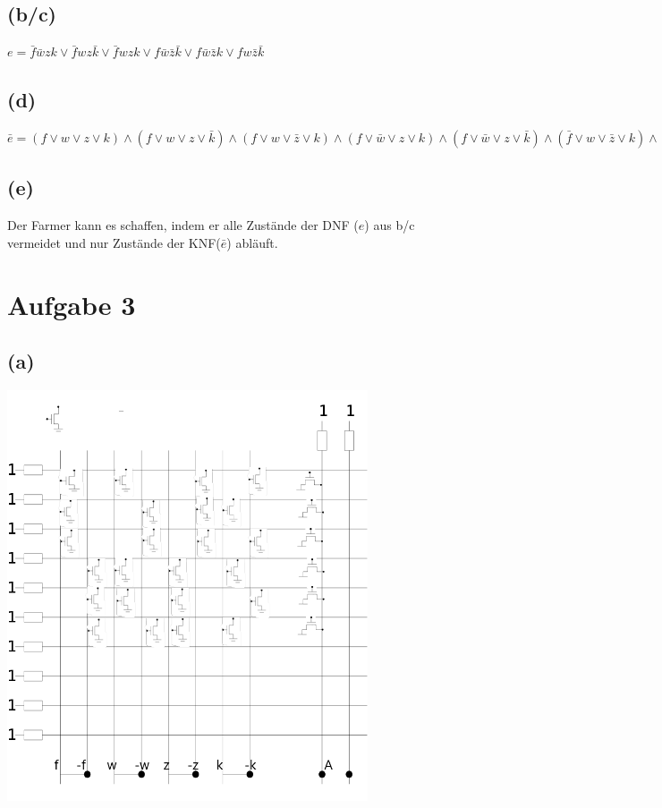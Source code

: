 \documentclass[a4paper,
  twoside, %
  headlines=2.1 %
  ]{scrartcl}
\begin{document}
\subsection*{(b/c)}
$	e = \bar{f}\bar{w}zk \lor \bar{f}wz\bar{k}\lor \bar{f}wzk \lor f\bar{w}\bar{z}\bar{k} \lor f \bar{w}\bar{z}k \lor fw\bar{z}\bar{k}$

\subsection*{(d)}

	$\bar{e} = (f\lor w\lor z\lor k) \land (f\lor w \lor z \lor \bar{k}) \land (f \lor w \lor \bar{z} \lor k) \land (f\lor \bar{w}\lor z\lor k) \land (f\lor \bar{w} \lor z\lor \bar{k}) \land (\bar{f}\lor w\lor \bar{z}\lor k) \land (\bar{f}\lor w\lor \bar{z}\lor \bar{k})\land (\bar{f}\lor \bar{w}\lor z \lor \bar{k})\land (\bar{f} \lor \bar{w} \lor \bar{z} \lor k) \land (\bar{f}\lor \bar{w} \lor \bar{z} \lor \bar{k}) $
\subsection*{(e)}
Der Farmer kann es schaffen, indem er alle Zustände der DNF ($e$) aus b/c vermeidet und nur Zustände der KNF($\bar{e}$) abläuft.
\section*{Aufgabe 3}
\subsection*{(a)}
\begin{center}
	\centering
	\includegraphics[width=0.8\textwidth]{pla1.png}
	\label{fig:Schaltung}
\end{center}
\end{document}
